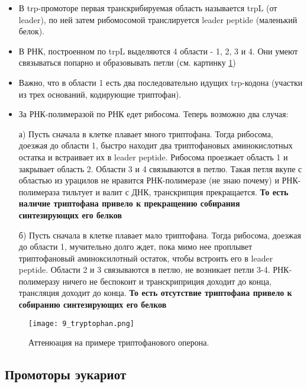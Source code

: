 \begin{itemize}
    \item В trp-промоторе первая транскрибируемая область называется trpL (от leader), по ней затем рибомосомой транслируется leader peptide (маленький белок).
    
    \item В РНК, построенном по trpL выделяются 4 области - 1, 2, 3 и 4. Они умеют связываться попарно и образовывать петли (см. картинку \ref{fig:9_tryptophan})
    
    \item Важно, что в области 1 есть два последовательно идущих trp-кодона (участки из трех оснований, кодирующие триптофан).
    
    \item За РНК-полимеразой по РНК едет рибосома. Теперь возможно два случая:
    
    а) Пусть сначала в клетке плавает много триптофана. Тогда рибосома, доезжая до области 1, быстро находит два триптофановых аминокислотных остатка и встраивает их в leader peptide. Рибосома проезжает область 1 и закрывает область 2. Области 3 и 4 связываются в петлю. Такая петля вкупе с областью из урацилов не нравится РНК-полимеразе (не знаю почему) и РНК-полимераза тильтует и валит с ДНК, транскрипция прекращается. \textbf{То есть наличие триптофана привело к прекращению собирания синтезирующих его белков}
    
    б) Пусть сначала в клетке плавает мало триптофана. Тогда рибосома, доезжая до области 1, мучительно долго ждет, пока мимо нее проплывет триптофановый аминоксилотный остаток, чтобы встроить его в leader peptide. Области 2 и 3 связываются в петлю, не возникает петли 3-4. РНК-полимеразу ничего не беспокоит и транскриприция доходит до конца, трансляция доходит до конца. \textbf{То есть отсутствие триптофана привело к собиранию синтезирующих его белков}
\end{itemize}

\begin{figure}[H]
    \centering
    \texttt{[image: 9\_tryptophan.png]}
    \caption{Аттенюация на примере триптофанового оперона.}
    \label{fig:9_tryptophan}
\end{figure}



\subsection{Промоторы эукариот}

